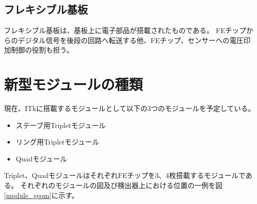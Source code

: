 \subsection{フレキシブル基板}
フレキシブル基板は、基板上に電子部品が搭載されたものである。
FEチップからのデジタル信号を後段の回路へ転送する他、FEチップ、センサーへの電圧印加制御の役割も担う。

\section{新型モジュールの種類}
現在、ITkに搭載するモジュールとして以下の3つのモジュールを予定している。
\begin{itemize}
  \item ステーブ用Tripletモジュール
  \item リング用Tripletモジュール
  \item Quadモジュール
\end{itemize}

Triplet、QuadモジュールはそれぞれFEチップを3、4枚搭載するモジュールである。
それぞれのモジュールの図及び検出器上における位置の一例を図\ref{module_geom}に示す。

